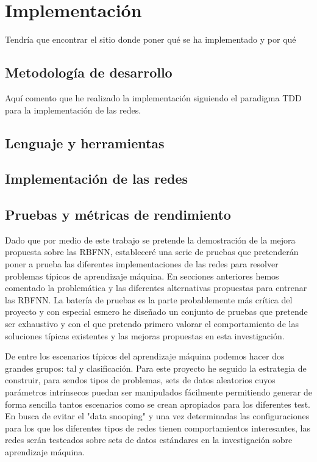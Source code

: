\documentclass[10pt,a4paper]{report}
\begin{document}
\chapter{Implementación}
Tendría que encontrar el sitio donde poner qué se ha implementado y por qué
\section{Metodología de desarrollo}
Aquí comento que he realizado la implementación siguiendo el paradigma TDD para la implementación de las redes.
\section{Lenguaje y herramientas}
\section{Implementación de las redes}
\section{Pruebas y métricas de rendimiento}
Dado que por medio de este trabajo se pretende la demostración de la mejora propuesta sobre las RBFNN, estableceré una serie de pruebas que pretenderán poner a prueba las diferentes implementaciones de las redes para resolver problemas típicos de aprendizaje máquina.
En secciones anteriores hemos comentado la problemática y las diferentes alternativas propuestas para entrenar las RBFNN. La batería de pruebas es la parte probablemente más crítica del proyecto y con especial esmero he diseñado un conjunto de pruebas que pretende ser exhaustivo y con el que pretendo primero valorar el comportamiento de las soluciones típicas existentes y las mejoras propuestas en esta investigación.

De entre los escenarios típicos del aprendizaje máquina podemos hacer dos grandes grupos: tal y clasificación. Para este proyecto he seguido la estrategia de construir, para sendos tipos de problemas, sets de datos aleatorios cuyos parámetros intrínsecos puedan ser manipulados fácilmente permitiendo generar de forma sencilla tantos escenarios como se crean apropiados para los diferentes test. En busca de evitar el "data snooping" y una vez determinadas las configuraciones para los que los diferentes tipos de redes tienen comportamientos interesantes, las redes serán testeados sobre sets de datos estándares en la investigación sobre aprendizaje máquina.
\end{document}

